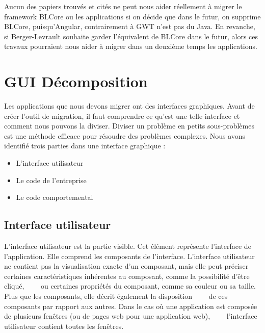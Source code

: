 \documentclass[11pt,]{article}
\providecommand{\tightlist}{%
  \setlength{\itemsep}{0pt}\setlength{\parskip}{0pt}}
\begin{document}
Aucun des papiers trouvés et cités ne peut nous aider réellement à
migrer le framework BLCore ou les applications si on décide que dans le
futur, on supprime BLCore, puisqu'Angular, contrairement à GWT n'est pas
du Java. En revanche, si Berger-Levrault souhaite garder l'équivalent de
BLCore dans le futur, alors ces travaux pourraient nous aider à migrer
dans un deuxième temps les applications.

\newpage

\hypertarget{gui-duxe9composition}{%
\section{GUI Décomposition}\label{gui-duxe9composition}}

Les applications que nous devons migrer ont des interfaces graphiques.
Avant de créer l'outil de migration, il faut comprendre ce qu'est une
telle interface et comment nous pouvons la diviser. Diviser un problème
en petits sous-problèmes est une méthode efficace pour résoudre des
problèmes complexes. Nous avons identifié trois parties dans une
interface graphique :

\begin{itemize}
\tightlist
\item
  L'interface utilisateur
\item
  Le code de l'entreprise
\item
  Le code comportemental
\end{itemize}

\hypertarget{interface-utilisateur}{%
\subsection{Interface utilisateur}\label{interface-utilisateur}}

L'interface utilisateur est la partie visible. Cet élément représente
l'interface de l'application. Elle comprend les composants de
l'interface. L'interface utilisateur ne contient pas la visualisation
exacte d'un composant, mais elle peut préciser certaines
caractéristiques inhérentes au composant, comme la possibilité d'être
cliqué, ~~~~ou certaines propriétés du composant, comme sa couleur ou sa
taille. Plus que les composants, elle décrit également la disposition
~~~~de ces composants par rapport aux autres. Dans le cas où une
application est composée de plusieurs fenêtres (ou de pages web pour une
application web), ~~~~l'interface utilisateur contient toutes les
fenêtres.
\end{document}
